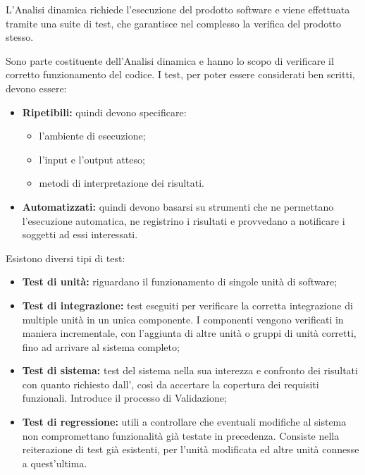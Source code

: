           L'Analisi dinamica richiede l'esecuzione del prodotto software e viene effettuata tramite una suite di test, che garantisce nel complesso la verifica del prodotto stesso.

        Sono parte costituente dell'Analisi dinamica e hanno lo scopo di verificare il corretto funzionamento del codice. I test, per poter essere considerati ben scritti, devono essere:
        \begin{itemize}
          \item \textbf{Ripetibili:} quindi devono specificare:
            \begin{itemize}
              \item l'ambiente di esecuzione;
              \item l'input e l'output atteso;
              \item metodi di interpretazione dei risultati.
            \end{itemize}
          \item \textbf{Automatizzati:} quindi devono basarsi su strumenti che ne permettano l'esecuzione automatica, ne registrino i risultati e provvedano a notificare i soggetti ad essi interessati.
        \end{itemize}
        Esistono diversi tipi di test:
        \begin{itemize}
          \item \textbf{Test di unità:} riguardano il funzionamento di singole unità di software;
          \item \textbf{Test di integrazione:} test eseguiti per verificare la corretta integrazione di multiple unità in un unica componente. I componenti vengono verificati in maniera incrementale, con l'aggiunta di altre unità o gruppi di unità corretti, fino ad arrivare al sistema completo;
          \item \textbf{Test di sistema:} test del sistema nella sua interezza e confronto dei risultati con quanto richiesto dall'\AdR{}, così da accertare la copertura dei requisiti funzionali. Introduce il processo di Validazione;
          \item \textbf{Test di regressione:} utili a controllare che eventuali modifiche al sistema non compromettano funzionalità già testate in precedenza. Consiste nella reiterazione di test già esistenti, per l'unità modificata ed altre unità connesse a quest'ultima.
        \end{itemize}

